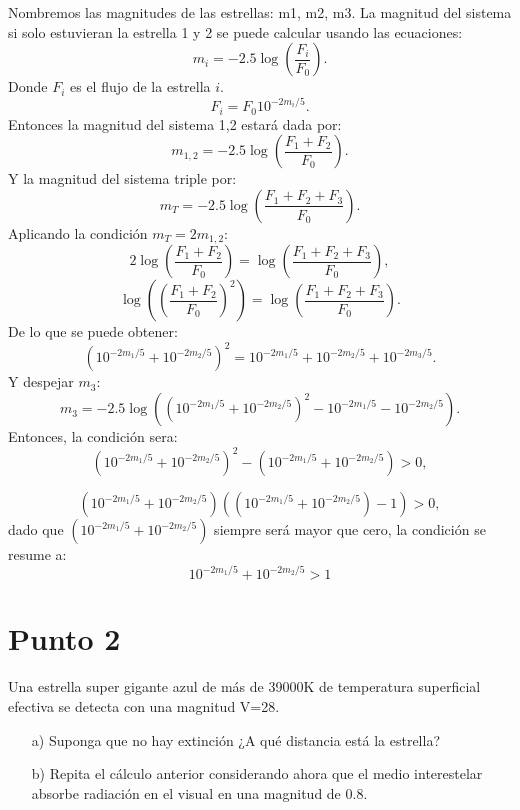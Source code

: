 \documentclass[notitlepage,letterpaper,12pt]{article} %
\begin{document}
Nombremos las magnitudes de las estrellas: m1, m2, m3.
La magnitud del sistema si solo estuvieran la estrella 1 y 2 se puede calcular usando las ecuaciones:
\begin{equation}
m_i = -2.5 \log(\frac{F_i}{F_0}).
\end{equation}
Donde $F_i$ es el flujo de la estrella $i$.
\begin{equation}
F_i = F_0 10^{-2m_i/5}.
\end{equation}
Entonces la magnitud del sistema 1,2 estará dada por:
\begin{equation}
m_{1,2} = -2.5 \log(\frac{F_1 + F_2}{F_0}).
\end{equation}
Y la magnitud del sistema triple por:
\begin{equation}
m_{T} = -2.5 \log(\frac{F_1 + F_2 + F_3}{F_0}).
\end{equation}
Aplicando la condición $m_T = 2m_{1,2}$:
\begin{equation}
2\log(\frac{F_1 + F_2}{F_0}) = \log(\frac{F_1 + F_2 + F_3}{F_0}),
\end{equation}
\begin{equation}
\log(\left(\frac{F_1+F_2}{F_0}\right)^2) = \log(\frac{F_1 + F_2 + F_3}{F_0}).
\end{equation}
De lo que se puede obtener:
\begin{equation}
(10^{-2m_1/5}+10^{-2m_2/5})^2 = 10^{-2m_1/5}+10^{-2m_2/5} + 10^{-2m_3/5}.
\end{equation}
Y despejar $m_3$:
\begin{equation}
m_3 = -2.5\log( (10^{-2m_1/5}+10^{-2m_2/5})^2 - 10^{-2m_1/5} - 10^{-2m_2/5} ).
\end{equation}
Entonces, la condición sera:
\begin{equation}
(10^{-2m_1/5}+10^{-2m_2/5})^2 - (10^{-2m_1/5} + 10^{-2m_2/5}) > 0,
\end{equation}

\begin{equation}
(10^{-2m_1/5}+10^{-2m_2/5})((10^{-2m_1/5} + 10^{-2m_2/5})-1) > 0,
\end{equation}
dado que $(10^{-2m_1/5}+10^{-2m_2/5})$ siempre será mayor que cero, la condición se resume a:
\begin{equation}
10^{-2m_1/5} + 10^{-2m_2/5} >1
\end{equation}

\section{Punto 2}
Una estrella super gigante azul de más de 39000K de temperatura superficial efectiva se detecta con una magnitud V=28.
\begin{itemize}
\item[a)] Suponga que no hay extinción ¿A qué distancia está la estrella?
\item[b)] Repita el cálculo anterior considerando ahora que el medio interestelar absorbe radiación en el visual en una magnitud de 0.8.
\end{itemize}
\end{document}
